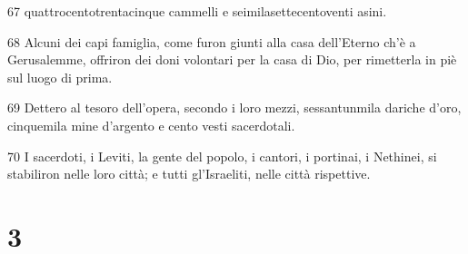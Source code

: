 \par 67 quattrocentotrentacinque cammelli e seimilasettecentoventi asini.
\par 68 Alcuni dei capi famiglia, come furon giunti alla casa dell'Eterno ch'è a Gerusalemme, offriron dei doni volontari per la casa di Dio, per rimetterla in piè sul luogo di prima.
\par 69 Dettero al tesoro dell'opera, secondo i loro mezzi, sessantunmila dariche d'oro, cinquemila mine d'argento e cento vesti sacerdotali.
\par 70 I sacerdoti, i Leviti, la gente del popolo, i cantori, i portinai, i Nethinei, si stabiliron nelle loro città; e tutti gl'Israeliti, nelle città rispettive.

\chapter{3}

